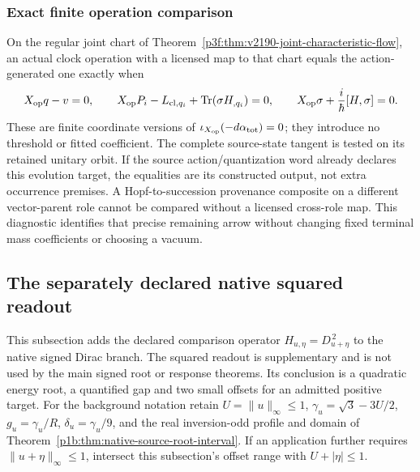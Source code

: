 \documentclass[11pt,a4paper]{article}
\begin{document}
\subsubsection{Exact finite operation comparison}
On the regular joint chart of
Theorem~\ref{p3f:thm:v2190-joint-characteristic-flow}, an actual clock
operation with a licensed map to that chart equals the action-generated
one exactly when
\[
 X_{\rm op}q-v=0,\qquad
 X_{\rm op}P_i-L_{{\rm cl},q_i}
                   +\operatorname{Tr}(\sigma H_{,q_i})=0,\qquad
 X_{\rm op}\sigma+\frac{i}{\hbar}[H,\sigma]=0.
\]
These are finite coordinate versions of
\(\iota_{X_{\rm op}}(-d\alpha_{\rm tot})=0\); they introduce no threshold
or fitted coefficient.  The complete source-state tangent is tested on
its retained unitary orbit.  If the source action/quantization word already
declares this evolution target, the equalities are its constructed output,
not extra occurrence premises.  A Hopf-to-succession provenance composite
on a different vector-parent role cannot be compared without a licensed
cross-role map.  This diagnostic identifies that precise remaining arrow
without changing fixed terminal mass coefficients or choosing a vacuum.



\subsection{The separately declared native squared readout}
\label{p3f:app:native-source-square-readout}

This subsection adds the declared comparison operator
\(H_{u,\eta}=D_{u+\eta}^{\,2}\) to the native signed Dirac branch.
The squared readout is supplementary and is not used by the main signed
root or response theorems. Its conclusion is a quadratic energy root,
a quantified gap and two small offsets for an admitted positive target.
For the background notation retain
\(U=\lVert u\rVert_\infty\le1\),
\(\gamma_u=\sqrt3-3U/2\), \(g_u=\gamma_u/R\),
\(\delta_u=\gamma_u/9\), and the real inversion-odd profile and domain
of Theorem~\ref{p1b:thm:native-source-root-interval}.
If an application further requires \(\lVert u+\eta\rVert_\infty\le1\),
intersect this subsection's offset range with \(U+|\eta|\le1\).
\end{document}
